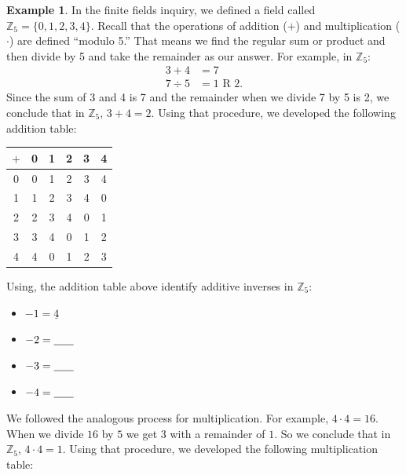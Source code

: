 \documentclass[11pt]{article}
\newenvironment{task}
	{\begin{mdframed}[linecolor=lightgray, linewidth=3pt]\raggedright}
	{\end{mdframed}}
\theoremstyle{definition}
\newtheorem{example}[theorem]{Example}
\begin{document}
\begin{example}
  In the finite fields inquiry, we defined a field called $\mathbb{Z}_5 = \{ 0, 1, 2, 3, 4\}$. Recall that the operations of addition ($+$) and multiplication ($\cdot$) are defined ``modulo 5.'' That means we find
  the regular sum or product and then divide by 5 and take the remainder as our answer. For example, in $\mathbb{Z}_5$:
  \begin{align*}
    3 + 4 &= 7\\
    7 \div 5 &= 1 \text{ R } 2.
  \end{align*}
  Since the sum of 3 and 4 is 7 and the remainder when we divide 7 by 5 is 2, we conclude that in $\mathbb{Z}_5$, $3 + 4 = 2$. Using that procedure, we 
  developed the following addition table:

  \begin{center}
    \begin{tabular}{|c|c|c|c|c|c|}\\ \hline
      $+$ & 0 & 1 & 2 & 3 & 4 \\ \hline
      0   & 0 & 1 & 2 & 3 & 4 \\ \hline
      1   & 1 & 2 & 3 & 4 & 0 \\ \hline
      2   & 2 & 3 & 4 & 0 & 1 \\ \hline
      3   & 3 & 4 & 0 & 1 & 2 \\ \hline
      4   & 4 & 0 & 1 & 2 & 3 \\ \hline
    \end{tabular}
  \end{center}
  \begin{task}
  Using, the addition table above identify additive inverses in $\mathbb{Z}_5$: 
  \begin{itemize}
    \item $-1 = \underline{4}$
    \item $-2 = \underline{\hspace{.25in}}$
    \item $-3 = \underline{\hspace{.25in}}$
    \item $-4 = \underline{\hspace{.25in}}$
  \end{itemize}
  \end{task}

  We followed the analogous process for multiplication. For example, $4 \cdot 4 = 16$. When we divide $16$ by $5$ we get $3$ with a remainder of $1$. So we
  conclude that in $\mathbb{Z}_5$, $4 \cdot 4 = 1$. Using that procedure, we developed the following multiplication table:


\end{example}
\end{document}
